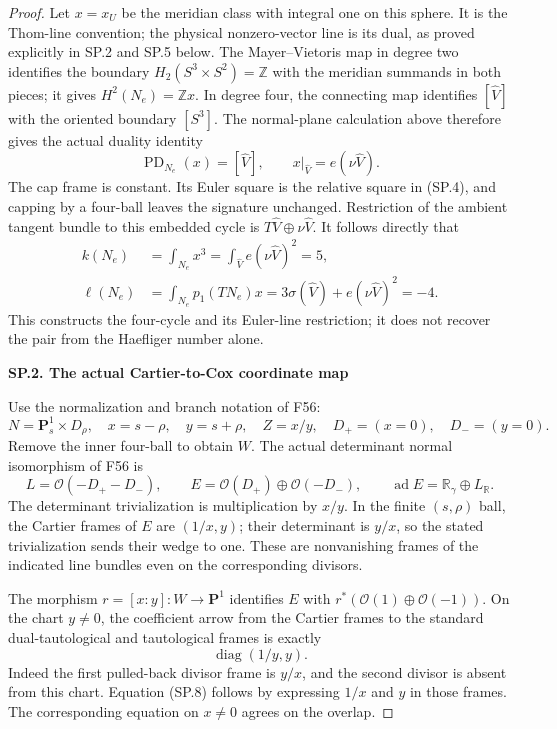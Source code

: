 \begin{proof}
Let \(x=x_U\) be the meridian class with integral one on this sphere.
It is the Thom-line convention; the physical nonzero-vector line is its
dual, as proved explicitly in SP.2 and SP.5 below.
The Mayer--Vietoris map in degree two identifies the boundary
\(H_2(S^3\times S^2)=\mathbb Z\) with the meridian summands in
both pieces; it gives \(H^2(N_e)=\mathbb Zx\). In degree four,
the connecting map identifies \([\widehat V]\) with the oriented
boundary \([S^3]\). The normal-plane calculation above therefore
gives the actual duality identity
\[
       \operatorname{PD}_{N_e}(x)=[\widehat V],\qquad
       x|_{\widehat V}=e(\nu\widehat V).                 \tag{SP.5}
\]
The cap frame is constant. Its Euler square is the relative square
in (SP.4), and capping by a four-ball leaves the signature unchanged.
Restriction of the ambient tangent bundle to this embedded cycle is
\(T\widehat V\oplus\nu\widehat V\). It follows directly that
\[
 \begin{aligned}
 k(N_e)&=\int_{N_e}x^3=\int_{\widehat V}e(\nu\widehat V)^2=5,\\
 \ell(N_e)&=\int_{N_e}p_1(TN_e)x
       =3\sigma(\widehat V)+e(\nu\widehat V)^2=-4.
 \end{aligned}                                             \tag{SP.6}
\]
This constructs the four-cycle and its Euler-line restriction; it
does not recover the pair from the Haefliger number alone.

\par

\medskip\noindent\textbf{SP.2. The actual Cartier-to-Cox coordinate map}

\par\nobreak

Use the normalization and branch notation of F56:
\[
 N=\mathbf P^1_s\times D_\rho,\quad
 x=s-\rho,\quad y=s+\rho,\quad Z=x/y,\quad
 D_+=(x=0),\quad D_-=(y=0).
\]
Remove the inner four-ball to obtain \(W\). The actual determinant
normal isomorphism of F56 is
\[
 L=\mathcal O(-D_+-D_-),\qquad
 E=\mathcal O(D_+)\oplus\mathcal O(-D_-),\qquad
 \operatorname{ad}E=\mathbb R_\gamma\oplus L_{\mathbb R}.
                                                               \tag{SP.7}
\]
The determinant trivialization is multiplication by \(x/y\).
In the finite \((s,\rho)\) ball, the Cartier frames of \(E\) are
\((1/x,y)\); their determinant is \(y/x\), so the stated
trivialization sends their wedge to one. These are nonvanishing
frames of the indicated line bundles even on the corresponding
divisors.

The morphism \(r=[x:y]:W\to\mathbf P^1\) identifies \(E\)
with \(r^*(\mathcal O(1)\oplus\mathcal O(-1))\). On the chart
\(y\ne0\), the coefficient arrow from the Cartier frames to the
standard dual-tautological and tautological frames is exactly
\[
                         \operatorname{diag}(1/y,y).      \tag{SP.8}
\]
Indeed the first pulled-back divisor frame is \(y/x\), and the
second divisor is absent from this chart. Equation (SP.8) follows by
expressing \(1/x\) and \(y\) in those frames. The corresponding
equation on \(x\ne0\) agrees on the overlap.


\end{proof}
